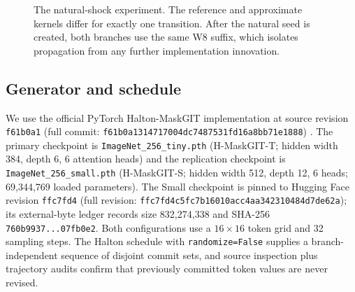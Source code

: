 \documentclass[11pt,a4paper]{article}
\theoremstyle{plain}
\theoremstyle{definition}
\theoremstyle{remark}
\newcommand{\rholabel}{\widetilde{\rho}}
\begin{document}
\begin{figure}[t]
\centering
{}
\caption{The natural-shock experiment. The reference and approximate kernels
differ for exactly one transition. After the natural seed is created, both
branches use the same W8 suffix, which isolates propagation from any further
implementation innovation.}
\label{fig:pipeline}
\end{figure}

\subsection{Generator and schedule}
We use the official PyTorch Halton-MaskGIT implementation at source revision \texttt{f61b0a1} (full commit:\allowbreak
\nolinkurl{f61b0a1314717004dc7487531fd16a8bb71e1888})
\citep{besnier2025halton}. The primary checkpoint is
\texttt{ImageNet\_256\_tiny.pth} (H-MaskGIT-T; hidden width 384, depth 6,
6 attention heads) and the replication checkpoint is
\texttt{ImageNet\_256\_small.pth} (H-MaskGIT-S; hidden width 512, depth 12,
6 heads; 69,344,769 loaded parameters). The Small checkpoint is pinned to Hugging
Face revision \texttt{ffc7fd4} (full revision:\allowbreak
\nolinkurl{ffc7fd4c5fc7b16010acc4aa342310484d7de62a}); its
external-byte ledger records size 832,274,338 and SHA-256
\texttt{760b9937...07fb0e2}. Both configurations use a $16\times16$ token grid
and 32 sampling steps. The Halton schedule with
\texttt{randomize=False} supplies a branch-independent sequence of disjoint
commit sets, and source inspection plus trajectory audits confirm that
previously committed token values are never revised.
\end{document}
